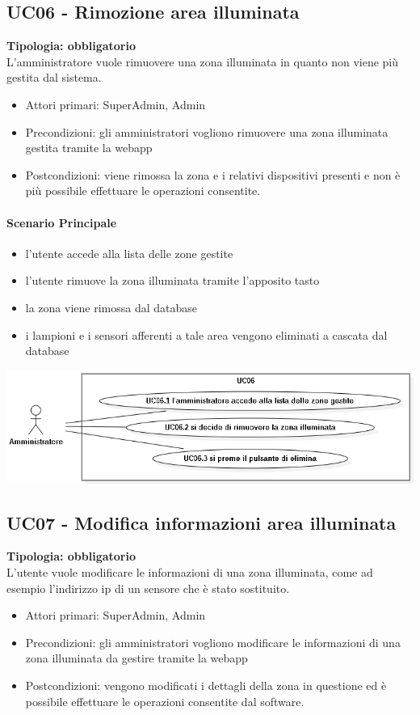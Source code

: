 \documentclass[12pt]{article}
\begin{document}
\subsection{UC06 - Rimozione area illuminata}
\textbf{Tipologia: obbligatorio} \\
L'amministratore vuole rimuovere una zona illuminata in quanto non viene più gestita dal sistema.
\begin{itemize}
	\item Attori primari: SuperAdmin, Admin
	\item Precondizioni: gli amministratori vogliono rimuovere una zona illuminata gestita tramite la webapp
	\item Postcondizioni: viene rimossa la zona e i relativi dispositivi presenti e non è più possibile effettuare le operazioni consentite.
\end{itemize}
\paragraph{Scenario Principale}
\begin{itemize}
	\item l'utente accede alla lista delle zone gestite
	\item l'utente rimuove la zona illuminata tramite l'apposito tasto
	\item la zona viene rimossa dal database 
	\item i lampioni e i sensori afferenti a tale area vengono eliminati a cascata dal database
\end{itemize}

\includegraphics[scale=0.5]{UC06.png}

\subsection{UC07 - Modifica informazioni area illuminata}
\textbf{Tipologia: obbligatorio} \\
L'utente vuole modificare le informazioni di una zona illuminata, come ad esempio l'indirizzo ip di un sensore che è stato sostituito.
\begin{itemize}
	\item Attori primari: SuperAdmin, Admin
	\item Precondizioni: gli amministratori vogliono modificare le informazioni di una  zona illuminata da gestire tramite la webapp
	\item Postcondizioni: vengono modificati i dettagli della zona in questione ed è possibile effettuare le operazioni consentite dal software.
\end{itemize}
\end{document}
